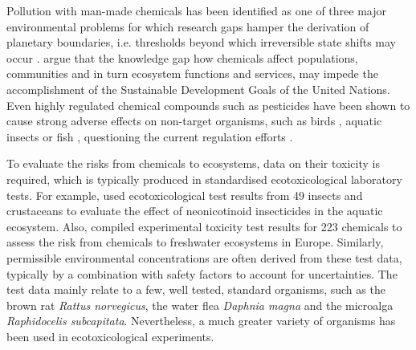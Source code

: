 \documentclass[journal,datadescriptor,accept,moreauthors,pdftex]{Definitions/mdpi}
\begin{document}
Pollution with man-made chemicals has been identified as one of three major environmental problems for which research gaps hamper the derivation of planetary boundaries, i.e. thresholds beyond which irreversible state shifts may occur \citep{steffen_anthropocene_2007, steffen_planetary_2015}. \citet{bernhardt_synthetic_2017} argue that the knowledge gap how chemicals affect populations, communities and in turn ecosystem functions and services, may impede the accomplishment of the Sustainable Development Goals \citep{rosa_transforming_2017} of the United Nations. Even highly regulated chemical compounds such as pesticides have been shown to cause strong adverse effects on non-target organisms, such as birds \citep{hallmann_declines_2014}, aquatic insects \citep{beketov_pesticides_2013} or fish \citep{yamamuro_neonicotinoids_2019}, questioning the current regulation efforts \citep{schafer_future_2019}.

To evaluate the risks from chemicals to ecosystems, data on their toxicity is required, which is typically produced in standardised ecotoxicological laboratory tests. For example, \citet{morrissey_neonicotinoid_2015} used ecotoxicological test results from 49 insects and crustaceans to evaluate the effect of neonicotinoid insecticides in the aquatic ecosystem. Also, \citet{malaj_organic_2014} compiled experimental toxicity test results for 223 chemicals to assess the risk from chemicals to freshwater ecosystems in Europe. Similarly, permissible environmental concentrations are often derived from these test data, typically by a combination with safety factors to account for uncertainties. The test data mainly relate to a few, well tested, standard organisms, such as the brown rat \textit{Rattus norvegicus}, the water flea \textit{Daphnia magna} and the microalga \textit{Raphidocelis subcapitata}. Nevertheless, a much greater variety of organisms has been used in ecotoxicological experiments.
\end{document}
